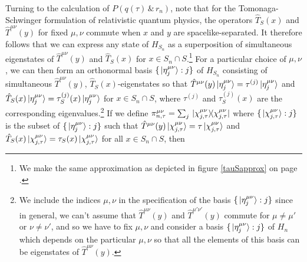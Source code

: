 Turning to the calculation of $P(q(\tau)\, \& \, r_n)$, note that for the Tomonaga-Schwinger formulation of relativistic quantum physics, the operators $\hat{T}_S(x)$ and $\hat{T}^{\mu\nu}(y)$ for fixed $\mu,\nu$ commute when $x$ and $y$ are spacelike-separated. It therefore follows that we can express any state of $H_{S_n}$ as a superposition of simultaneous eigenstates of $\hat{T}^{\mu\nu}(y)$ and $\hat{T}_S(x)$ for $x\in S_n\cap S$.\footnote{We make the same approximation as depicted in figure \ref{tauSapprox} on page \pageref{tauSapprox}.}  For a particular choice of $\mu,\nu$, we can then form an orthonormal basis $\{\ket*{\eta_j^{\mu\nu}}:j\}$ of %
%
 $H_{S_n}$ consisting of simultaneous $\hat{T}^{\mu\nu}(y)$, $\hat{T}_S(x)$-eigenstates so that $\hat{T}^{\mu\nu}(y)\ket*{\eta_j^{\mu\nu}}=\tau^{(j)}\ket*{\eta_j^{\mu\nu}}$ and $\hat{T}_{S}(x)\ket*{\eta_j^{\mu\nu}}=\tau_S^{(j)}(x)\ket*{\eta_j^{\mu\nu}}$ for $x\in S_n\cap S$, where $\tau^{(j)}$ and $\tau_S^{(j)}(x)$ are the corresponding eigenvalues.\footnote{We include the indices   $\mu,\nu$ in the specification of the basis $\{\ket*{\eta_j^{\mu\nu}}:j\}$ since in general, we can't assume that $\hat{T}^{\mu\nu}(y)$ and $\hat{T}^{\mu'\nu'}(y)$ commute for $\mu\neq \mu'$ or $\nu\neq \nu'$, and so we have to fix $\mu,\nu$ and consider a basis $\{\ket*{\eta_j^{\mu\nu}}:j\}$ of $H_n$ which depends on the particular $\mu,\nu$ so that all the elements of this basis can be eigenstates of  $\hat{T}^{\mu\nu}(y)$.} If we define %
   $\pi_{n,\tau}^{\mu\nu}=\sum_j\dyad*{\chi_{j,\tau}^{\mu\nu}}$ where $\{\ket*{\chi_{j,\tau}^{\mu\nu}}:j\}$ %
  is the subset of $\{\ket*{\eta_j^{\mu\nu}}:j\}$ such that $\hat{T}^{\mu\nu}(y)\ket*{\chi_{j,\tau}^{\mu\nu}}=\tau\ket*{\chi_{j,\tau}^{\mu\nu}}$ and $\hat{T}_S(x)\ket*{\chi_{j,\tau}^{\mu\nu}}=\tau_S(x)\ket*{\chi_{j,\tau}^{\mu\nu}}$ for all $x\in S_n\cap S$, then 
